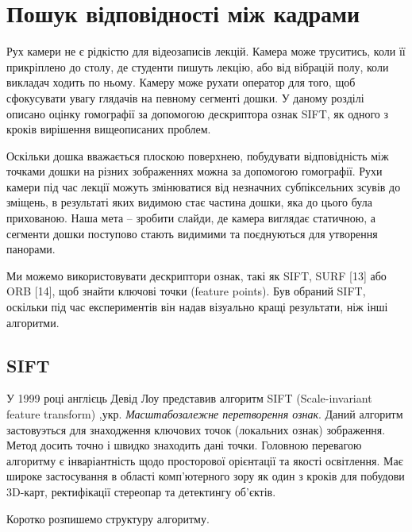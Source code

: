 \section{Пошук відповідності між кадрами}

Рух камери не є рідкістю для відеозаписів лекцій. Камера може труситись,
коли її прикріплено до столу, де студенти пишуть лекцію, або від
вібрацій полу, коли викладач ходить по ньому. Камеру може рухати
оператор для того, щоб сфокусувати увагу глядачів на певному сегменті
дошки. У даному розділі описано оцінку гомографії за допомогою
дескриптора ознак SIFT, як одного з кроків вирішення вищеописаних
проблем.

Оскільки дошка вважається плоскою поверхнею, побудувати відповідність
між точками дошки на різних зображеннях можна за допомогою гомографії.
Рухи камери під час лекції можуть змінюватися від незначних
субпіксельних зсувів до зміщень, в результаті яких видимою стає частина
дошки, яка до цього була прихованою. Наша мета -- зробити слайди, де
камера виглядає статичною, а сегменти дошки поступово стають видимими та 
поєднуються для утворення панорами.

Ми можемо використовувати дескриптори ознак, такі як SIFT, SURF [13] або ORB
[14], щоб знайти ключові точки (feature points). Був обраний SIFT, оскільки під час
експериментів він надав візуально кращі результати, ніж інші алгоритми.


\subsection{SIFT}

У 1999 році англієць Девід Лоу представив алгоритм SIFT (Scale-invariant feature transform) 
,укр. \textit{Масштабозалежне перетворення ознак}. Даний алгоритм 
застовуэться для знаходження ключових точок (локальних ознак) зображення. Метод досить точно 
і швидко знаходить дані точки.
Головною перевагою алгоритму є інваріантність щодо просторової орієнтації та якості освітлення.
Має широке застосування в області комп'ютерного зору як один з кроків для побудови 3D-карт, 
ректифікації стереопар та детектингу об'єктів.

Коротко розпишемо структуру алгоритму.

